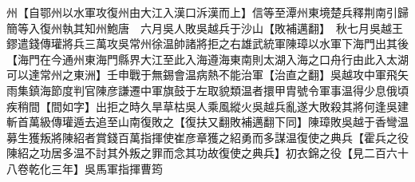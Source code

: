 州【自鄂州以水軍攻復州由大江入漢口泝漢而上】信等至潭州東境楚兵釋荆南引歸簡等入復州執其知州鮑唐　六月吳人敗吳越兵于沙山【敗補邁翻】　秋七月吳越王鏐遣錢傳瓘將兵三萬攻吳常州徐温帥諸將拒之右雄武統軍陳璋以水軍下海門出其後【海門在今通州東海門縣界大江至此入海遵海東南則太湖入海之口舟行由此入太湖可以達常州之東洲】壬申戰于無錫會温病熱不能治軍【治直之翻】吳越攻中軍飛矢雨集鎮海節度判官陳彦謙遷中軍旗鼓于左取貌類温者擐甲胄號令軍事温得少息俄頃疾稍間【間如字】出拒之時久旱草枯吳人乘風縱火吳越兵亂遂大敗殺其將何逢吳建斬首萬級傳瓘遁去追至山南復敗之【復扶又翻敗補邁翻下同】陳璋敗吳越于香彎温募生獲叛將陳紹者賞錢百萬指揮使崔彦章獲之紹勇而多謀温復使之典兵【霍兵之役陳紹之功居多温不討其外叛之罪而念其功故復使之典兵】初衣錦之役【見二百六十八卷乾化三年】吳馬軍指揮曹筠